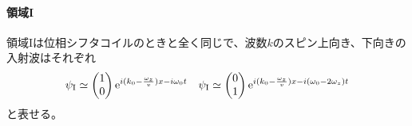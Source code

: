 \paragraph{領域I}
領域Iは位相シフタコイルのときと全く同じで、波数$k$のスピン上向き、下向きの入射波はそれぞれ
\begin{align}
\psi_\mathrm{I}\simeq \begin{pmatrix} 1\\0 \end{pmatrix} \mathrm{e}^{i (k_0-\frac{\omega_z}{v}) x -i\omega_0 t} && \psi_\mathrm{I}\simeq \begin{pmatrix} 0\\1 \end{pmatrix} \mathrm{e}^{i (k_0-\frac{\omega_z}{v}) x -i(\omega_0-2\omega_z) t}
\end{align}
と表せる。

